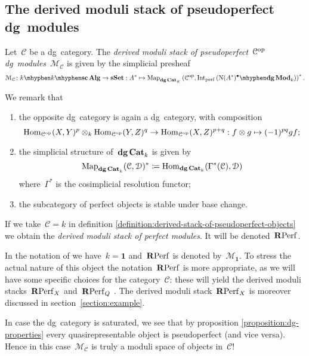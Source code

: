 \begin{refsection}
\subsection{The derived moduli stack of pseudoperfect dg~modules}
\begin{definition}
  \label{definition:derived-stack-of-pseudoperfect-objects}
  Let~$\mathcal{C}$ be a dg~category. The \emph{derived moduli stack of pseudoperfect~$\mathcal{C}^{\mathrm{op}}$\dash dg~modules}~$\mathcal{M}_{\mathcal{C}}$ is given by the simplicial presheaf
  \begin{equation}
    \mathcal{M}_{\mathcal{C}}\colon{k}\mhyphen\scAlg\to\sSet:A^*\mapsto\Map_{\dgCat_K}\left( \mathcal{C}^\opp,\Int_\perf\left( {\nerve(A^*)^\bullet}\mhyphen\dgMod_k \right) \right)^*.
  \end{equation}
\end{definition}

We remark that
\begin{enumerate}
  \item the opposite dg~category is again a dg~category, with composition
    \begin{equation}
      \mathrm{Hom}_{\mathcal{C}^{\mathrm{op}}}(X,Y)^p\otimes_k\mathrm{Hom}_{\mathcal{C}^{\mathrm{op}}}(Y,Z)^q\to\mathrm{Hom}_{\mathcal{C}^{\mathrm{op}}}(X,Z)^{p+q}:f\otimes g\mapsto(-1)^{pq}gf;
    \end{equation}
  \item the simplicial structure of~$\mathbf{dg\,Cat}_k$ is given by
    \begin{equation}
      \operatorname{\mathrm{Map}}_{\mathbf{dg\,Cat}_k}(\mathcal{C},\mathcal{D})^*\coloneqq\mathrm{Hom}_{\mathbf{dg\,Cat}_k}(\Gamma^*(\mathcal{C}),\mathcal{D})
    \end{equation}
    where~$\Gamma^*$ is the cosimplicial resolution functor;
  \item the subcategory of perfect objects is stable under base change.
\end{enumerate}

\begin{definition}
  If we take~$\mathcal{C}=k$ in definition \ref{definition:derived-stack-of-pseudoperfect-objects} we obtain the \emph{derived moduli stack of perfect modules}. It will be denoted~$\mathbf{R}\mathrm{Perf}$.
\end{definition}

In the notation of \cite{toen-vaquie} we have~$k=\mathbf{1}$ and~$\mathbf{R}\mathrm{Perf}$ is denoted by~$\mathcal{M}_{\mathbf{1}}$. To stress the actual nature of this object the notation~$\mathbf{R}\mathrm{Perf}$ is more appropriate, as we will have some specific choices for the category~$\mathcal{C}$: these will yield the derived moduli stacks~$\mathbf{R}\mathrm{Perf}_X$ and~$\mathbf{R}\mathrm{Perf}_Q$ \cite[section 3.5]{toen-vaquie}. The derived moduli stack~$\mathbf{R}\mathrm{Perf}_X$ is moreover discussed in section~\ref{section:example}.
\begin{remark}
  \label{remark:saturated}
  In case the dg~category is saturated, we see that by proposition \ref{proposition:dg-properties} every quasirepresentable object is pseudoperfect (and vice versa). Hence in this case~$\mathcal{M}_{\mathcal{C}}$ is truly a moduli space of objects in~$\mathcal{C}$!
\end{remark}


\end{refsection}
